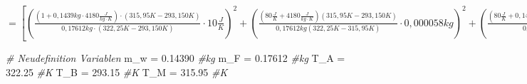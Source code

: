 \documentclass[class=article, crop=false]{standalone}
\newenvironment{Shaded}{\begin{snugshade}}{\end{snugshade}}
\newcommand{\CommentTok}[1]{\textcolor[rgb]{0.56,0.35,0.01}{\textit{#1}}}
\newcommand{\FloatTok}[1]{\textcolor[rgb]{0.00,0.00,0.81}{#1}}
\newcommand{\NormalTok}[1]{#1}
\newcommand{\OtherTok}[1]{\textcolor[rgb]{0.56,0.35,0.01}{#1}}
\begin{document}
\(=[(\frac{(1+0,1439kg\cdot 4180\frac{J}{kg\cdot K})\cdot (315,95K-293,150K)}{0,17612kg\cdot (322,25K-293,150K)}\cdot 10\frac{J}{K})^2+(\frac{(80\frac{J}{K}+4180\frac{J}{kg\cdot K})(315,95K-293,150K)}{0,17612kg(322,25K-315,95K)}\cdot 0,000058kg)^2+(\frac{(80\frac{J}{K}+0,1439kg\cdot 4180\frac{J}{kg\cdot K})\cdot (1-293,150K)}{0,17612kg(322,25K-1)}\cdot 0,029K)^2+(\frac{(80\frac{J}{K}+0,1439kg\cdot 4180\frac{J}{kg\cdot K})\cdot (315,95K-1)}{0,17612kg(322,25K-315,95K)}\cdot 0,029K)^2+(\frac{(80\frac{J}{K}+0,1439kg\cdot 4180\frac{J}{kg\cdot K})\cdot (315,95K-293,150K)}{322,25K-315,95K}\cdot 0,000029kg)^2+(\frac{(80\frac{J}{K}+0,1439kg\cdot 4180\frac{J}{kg\cdot K})\cdot (315,95K-293,150K)}{0,17612kg(1-315,95K)}\cdot 0,029K)^2]^{\frac{1}{2}}\)

\begin{Shaded}
\begin{Highlighting}[]
\CommentTok{\# Neudefinition Variablen}
\NormalTok{m\_w }\OtherTok{=} \FloatTok{0.14390} \CommentTok{\#kg}
\NormalTok{m\_F }\OtherTok{=} \FloatTok{0.17612} \CommentTok{\#kg}
\NormalTok{T\_A }\OtherTok{=} \FloatTok{322.25} \CommentTok{\#K}
\NormalTok{T\_B }\OtherTok{=} \FloatTok{293.15} \CommentTok{\#K}
\NormalTok{T\_M }\OtherTok{=} \FloatTok{315.95} \CommentTok{\#K}


\end{Highlighting}
\end{Shaded}
\end{document}

